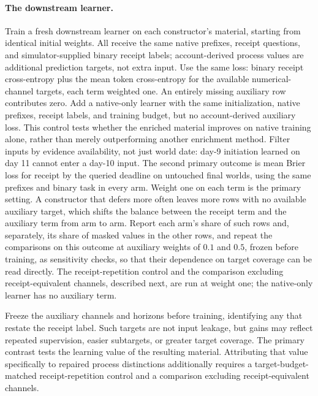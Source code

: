 \documentclass[10pt]{article}
\begin{document}
\paragraph{The downstream learner.}
Train a fresh downstream learner on each constructor's material, starting from
identical initial weights. All receive
the same native prefixes, receipt questions, and simulator-supplied binary
receipt labels; account-derived process values are additional prediction
targets, not extra input. Use the same loss: binary receipt cross-entropy plus
the mean token cross-entropy for the available numerical-channel targets,
each term weighted one. An entirely missing auxiliary row contributes zero.
Add a native-only learner with the same initialization, native prefixes,
receipt labels, and training budget, but no account-derived auxiliary loss.
This control tests whether the enriched material improves on native training
alone, rather than merely outperforming another enrichment method.
Filter inputs by evidence availability, not just world date: day-9 initiation
learned on day 11 cannot enter a day-10 input. The second primary outcome is mean Brier
loss for receipt by the queried deadline on untouched final worlds, using
the same prefixes and binary task in every arm.
Weight one on each term is the primary setting. A constructor that defers more often
leaves more rows with no available auxiliary target, which shifts the balance between
the receipt term and the auxiliary term from arm to arm. Report each arm's share of
such rows and, separately, its share of masked values in the other rows, and repeat
the comparisons on this outcome at auxiliary weights of $0.1$ and $0.5$, frozen
before training, as sensitivity checks, so that their dependence on target coverage
can be read directly. The receipt-repetition control and the comparison excluding
receipt-equivalent channels, described next, are run at weight one; the native-only
learner has no auxiliary term.

Freeze the auxiliary channels and horizons before training, identifying any
that restate the receipt label. Such targets are not input leakage, but gains
may reflect repeated supervision, easier subtargets, or greater target
coverage. The primary contrast tests the learning value of the resulting
material. Attributing that value specifically to repaired process distinctions
additionally requires a target-budget-matched receipt-repetition control and
a comparison excluding receipt-equivalent channels.
\end{document}
